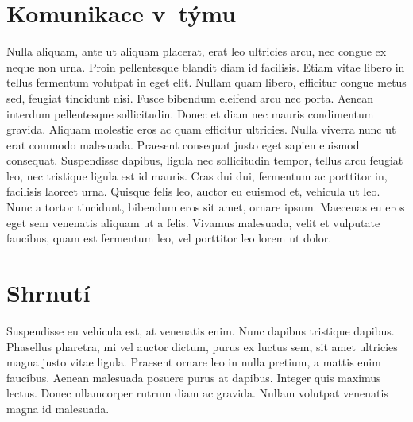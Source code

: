 \documentclass[11pt, a4paper]{article}
\begin{document}
\section{Komunikace v~týmu}
Nulla aliquam, ante ut aliquam placerat, erat leo ultricies arcu, nec congue ex neque non urna. Proin pellentesque blandit diam id facilisis. Etiam vitae libero in tellus fermentum volutpat in eget elit. Nullam quam libero, efficitur congue metus sed, feugiat tincidunt nisi. Fusce bibendum eleifend arcu nec porta. Aenean interdum pellentesque sollicitudin. Donec et diam nec mauris condimentum gravida. Aliquam molestie eros ac quam efficitur ultricies. Nulla viverra nunc ut erat commodo malesuada. Praesent consequat justo eget sapien euismod consequat. Suspendisse dapibus, ligula nec sollicitudin tempor, tellus arcu feugiat leo, nec tristique ligula est id mauris. Cras dui dui, fermentum ac porttitor in, facilisis laoreet urna. Quisque felis leo, auctor eu euismod et, vehicula ut leo. Nunc a tortor tincidunt, bibendum eros sit amet, ornare ipsum. Maecenas eu eros eget sem venenatis aliquam ut a felis. Vivamus malesuada, velit et vulputate faucibus, quam est fermentum leo, vel porttitor leo lorem ut dolor. 

\section{Shrnutí}
Suspendisse eu vehicula est, at venenatis enim. Nunc dapibus tristique dapibus. Phasellus pharetra, mi vel auctor dictum, purus ex luctus sem, sit amet ultricies magna justo vitae ligula. Praesent ornare leo in nulla pretium, a mattis enim faucibus. Aenean malesuada posuere purus at dapibus. Integer quis maximus lectus. Donec ullamcorper rutrum diam ac gravida. Nullam volutpat venenatis magna id malesuada. 
\end{document}
